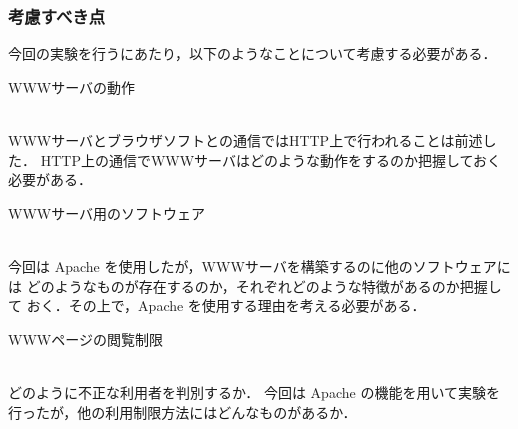 \subsubsection*{考慮すべき点}
今回の実験を行うにあたり，以下のようなことについて考慮する必要がある．

\begin{itemize}
{\bf \item{WWWサーバの動作}}\\
WWWサーバとブラウザソフトとの通信ではHTTP上で行われることは前述した．
HTTP上の通信でWWWサーバはどのような動作をするのか把握しておく必要がある．

{\bf \item{WWWサーバ用のソフトウェア}}\\
今回は Apache を使用したが，WWWサーバを構築するのに他のソフトウェアには
どのようなものが存在するのか，それぞれどのような特徴があるのか把握して
おく．その上で，Apache を使用する理由を考える必要がある．

{\bf \item{WWWページの閲覧制限}}\\
どのように不正な利用者を判別するか．
今回は Apache の機能を用いて実験を行ったが，他の利用制限方法にはどんなものがあるか．
\end{itemize}
